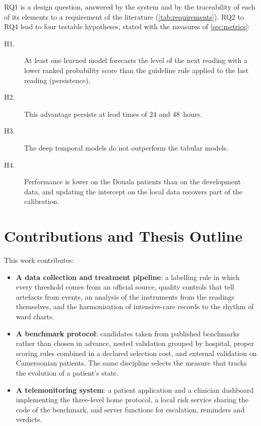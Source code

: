 RQ1 is a design question, answered by the system and by the traceability of each of its elements to a requirement of the literature (\cref{tab:requirements}). RQ2 to RQ4 lead to four testable hypotheses, stated with the measures of \cref{sec:metrics}:
\begin{description}
  \item[H1.] At least one learned model forecasts the level of the next reading with a lower ranked probability score than the guideline rule applied to the last reading (persistence).
  \item[H2.] This advantage persists at lead times of 24 and 48~hours.
  \item[H3.] The deep temporal models do not outperform the tabular models.
  \item[H4.] Performance is lower on the Douala patients than on the development data, and updating the intercept on the local data recovers part of the calibration.
\end{description}

\section*{Contributions and Thesis Outline}

This work contributes:
\begin{itemize}
  \item \textbf{A data collection and treatment pipeline}: a labelling rule in which every threshold comes from an official source, quality controls that tell artefacts from events, an analysis of the instruments from the readings themselves, and the harmonisation of intensive-care records to the rhythm of ward charts.
  \item \textbf{A benchmark protocol}: candidates taken from published benchmarks rather than chosen in advance, nested validation grouped by hospital, proper scoring rules combined in a declared selection cost, and external validation on Cameroonian patients. The same discipline selects the measure that tracks the evolution of a patient's state.
  \item \textbf{A telemonitoring system}: a patient application and a clinician dashboard implementing the three-level home protocol, a local risk service sharing the code of the benchmark, and server functions for escalation, reminders and verdicts.
\end{itemize}

